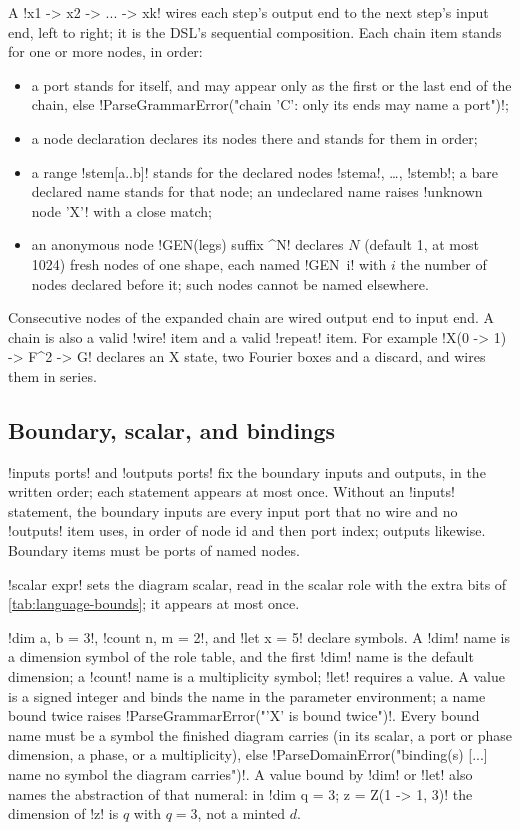 A  \code!x1 -> x2 -> ... -> xk! wires each step's output end to the next step's input end, left to right; it is the DSL's sequential composition. Each chain item stands for one or more nodes, in order:
\begin{itemize}
\item a port stands for itself, and may appear only as the first or the last end of the chain, else \code!ParseGrammarError("chain 'C': only its ends may name a port")!;
\item a node declaration declares its nodes there and stands for them in order;
\item a range \code!stem[a..b]! stands for the declared nodes \code!stema!, \ldots, \code!stemb!; a bare declared name stands for that node; an undeclared name raises \code!unknown node 'X'! with a close match;
\item an anonymous node \code!GEN(legs) suffix ^N! declares $N$ (default 1, at most 1024) fresh nodes of one shape, each named \code!GEN~i! with $i$ the number of nodes declared before it; such nodes cannot be named elsewhere.
\end{itemize}
Consecutive nodes of the expanded chain are wired output end to input end. A chain is also a valid \code!wire! item and a valid \code!repeat! item. For example \code!X(0 -> 1) -> F^2 -> G! declares an X state, two Fourier boxes and a discard, and wires them in series.

\subsection{Boundary, scalar, and bindings}

\code!inputs ports! and \code!outputs ports! fix the boundary inputs and outputs, in the written order; each statement appears at most once. Without an \code!inputs! statement, the boundary inputs are every input port that no wire and no \code!outputs! item uses, in order of node id and then port index; outputs likewise. Boundary items must be ports of named nodes.

\code!scalar expr! sets the diagram scalar, read in the scalar role with the extra bits of \cref{tab:language-bounds}; it appears at most once.

\code!dim a, b = 3!, \code!count n, m = 2!, and \code!let x = 5! declare symbols. A \code!dim! name is a dimension symbol of the role table, and the first \code!dim! name is the default dimension; a \code!count! name is a multiplicity symbol; \code!let! requires a value. A value is a signed integer and binds the name in the parameter environment; a name bound twice raises \code!ParseGrammarError("'X' is bound twice")!. Every bound name must be a symbol the finished diagram carries (in its scalar, a port or phase dimension, a phase, or a \bbox{} multiplicity), else \code!ParseDomainError("binding(s) [...] name no symbol the diagram carries")!. A value bound by \code!dim! or \code!let! also names the abstraction of that numeral: in \code!dim q = 3; z = Z(1 -> 1, 3)! the dimension of \code!z! is $q$ with $q=3$, not a minted $d$.

